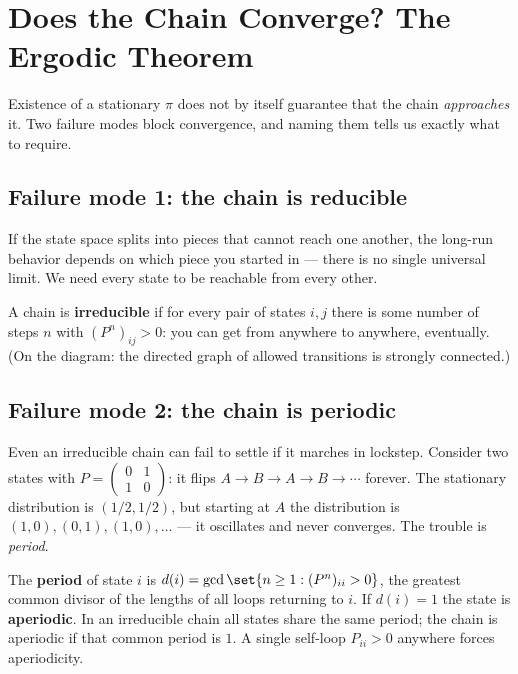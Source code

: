 \section{Does the Chain Converge? The Ergodic Theorem}
\label{ch24:ergodic}

Existence of a stationary $\pi$ does not by itself guarantee that the chain
\emph{approaches} it. Two failure modes block convergence, and naming them tells
us exactly what to require.

\subsection{Failure mode 1: the chain is reducible}

If the state space splits into pieces that cannot reach one another, the long-run
behavior depends on which piece you started in --- there is no single universal
limit. We need every state to be reachable from every other.

\begin{definition}[Irreducible]
\label{ch24:def-irreducible}
A chain is \textbf{irreducible} if for every pair of states $i,j$ there is some
number of steps $n$ with $(P^n)_{ij} > 0$: you can get from anywhere to anywhere,
eventually. (On the diagram: the directed graph of allowed transitions is
strongly connected.)
\end{definition}

\subsection{Failure mode 2: the chain is periodic}

Even an irreducible chain can fail to settle if it marches in lockstep. Consider
two states with $P = \left(\begin{smallmatrix} 0 & 1 \\ 1 & 0\end{smallmatrix}\right)$:
it flips $A \to B \to A \to B \to \cdots$ forever. The stationary distribution is
$(1/2,1/2)$, but starting at $A$ the distribution is $(1,0),(0,1),(1,0),\dots$ ---
it oscillates and never converges. The trouble is \emph{period}.

\begin{definition}
\label{ch24:def-aperiodic}
The \textbf{period} of state $i$ is $d(i) = \gcd\set{n \ge 1 : (P^n)_{ii} > 0}$,
the greatest common divisor of the lengths of all loops returning to $i$. If
$d(i)=1$ the state is \textbf{aperiodic}. In an irreducible chain all states share
the same period; the chain is aperiodic if that common period is $1$. A single
self-loop $P_{ii}>0$ anywhere forces aperiodicity.
\end{definition}

